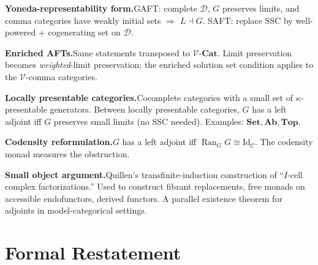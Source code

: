 \begin{summarybox}
\textbf{Yoneda-representability form.}\quad GAFT: complete $\mathcal{D}$,
$G$ preserves limits, and comma categories have weakly initial sets $\Rightarrow$
$L \dashv G$. SAFT: replace SSC by well-powered + cogenerating set on
$\mathcal{D}$.

\textbf{Enriched AFTs.}\quad Same statements transposed to
$\mathcal{V}$-$\mathbf{Cat}$. Limit preservation becomes
\emph{weighted}-limit preservation; the enriched solution set condition
applies to the $\mathcal{V}$-comma categories.

\textbf{Locally presentable categories.}\quad Cocomplete categories with a
small set of $\kappa$-presentable generators. Between locally presentable
categories, $G$ has a left adjoint iff $G$ preserves small limits (no
SSC needed). Examples: $\mathbf{Set}, \mathbf{Ab}, \mathbf{Top}$.

\textbf{Codensity reformulation.}\quad $G$ has a left adjoint iff
$\operatorname{Ran}_G G \cong \mathrm{Id}_\mathcal{C}$. The codensity monad
measures the obstruction.

\textbf{Small object argument.}\quad Quillen's transfinite-induction
construction of ``$I$-cell complex factorizations.'' Used to construct
fibrant replacements, free monads on accessible endofunctors, derived
functors. A parallel existence theorem for adjoints in model-categorical
settings.
\end{summarybox}


\section*{Formal Restatement}

